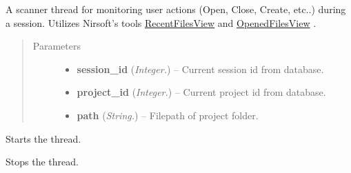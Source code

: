 \documentclass[letterpaper,10pt,english]{sphinxmanual}
\begin{document}

\begin{fulllineitems}
\label{api:controller.FILE_ACTION_SCANNER}
A scanner thread for monitoring user actions (Open, Close, Create, etc..) during a session. Utilizes Nirsoft's tools \href{http://www.nirsoft.net/utils/recent\_files\_view.html}{RecentFilesView} and \href{http://www.nirsoft.net/utils/opened\_files\_view.html}{OpenedFilesView} .
\begin{quote}\begin{description}
\item[{Parameters}] \leavevmode\begin{itemize}
\item {} 
\textbf{session\_id} (\emph{Integer.}) -- Current session id from database.

\item {} 
\textbf{project\_id} (\emph{Integer.}) -- Current project id from database.

\item {} 
\textbf{path} (\emph{String.}) -- Filepath of project folder.

\end{itemize}

\end{description}\end{quote}

\begin{fulllineitems}
\label{api:controller.FILE_ACTION_SCANNER.run}
Starts the thread.

\end{fulllineitems}


\begin{fulllineitems}
\label{api:controller.FILE_ACTION_SCANNER.stop}
Stops the thread.

\end{fulllineitems}


\end{fulllineitems}

\end{document}
